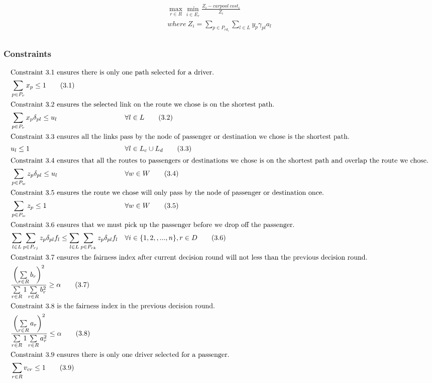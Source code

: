 \begin{align*}
  \max_{r \in R} \min_{i \in E_r} \frac{Z_i - carpool\ cost_i}{Z_i} \tag{IP1} \\
  where\ Z_i = \sum_{p \in P_{rd_i}} \sum_{l \in L} y_p \gamma_{pl} a_l \\
\end{align*}

\subsubsection*{Constraints}

\begin{align*}
  \intertext{Constraint 3.1 ensures there is only one path selected for a driver.}
  & \sum\limits_{p \in P_r} x_p \leq 1 \tag{3.1} \\
  \intertext{Constraint 3.2 ensures the selected link on the route we chose is on the shortest path.}
  & \sum\limits_{p \in P_r} x_p \delta_{pl} \leq u_l && \forall l \in L \tag{3.2} \\
  \intertext{Constraint 3.3 ensures all the links pass by the node of passenger or destination we chose is the shortest path.}
  & u_l \leq 1 && \forall l \in L_c \cup L_d \tag{3.3} \\
  \intertext{Constraint 3.4 ensures that all the routes to passengers or destinations we chose is on the shortest path and overlap the route we chose.}
  & \sum\limits_{p \in P_w} z_p \delta_{pl} \leq u_l && \forall w \in W \tag{3.4} \\
  \intertext{Constraint 3.5 ensures the route we chose will only pass by the node of passenger or destination once.}
  & \sum\limits_{p \in P_w} z_p \leq 1 && \forall w \in W \tag{3.5} \\
  \intertext{Constraint 3.6 ensures that we must pick up the passenger before we drop off the passenger.}
  & \sum\limits_{l \in L} \sum\limits_{p \in P_{rj}} z_p \delta_{pl} f_l \leq \sum\limits_{l \in L} \sum\limits_{p \in P_{rk}} z_p \delta_{pl} f_l && \forall i \in \{1,2,,...,n\}, r \in D \tag{3.6} \\
  \intertext{Constraint 3.7 ensures the fairness index after current decision round will not less than the previous decision round.}
  & \frac{\left(\sum\limits_{r \in R} b_r\right)^2}{\sum\limits_{r \in R} 1 \sum\limits_{r \in R} b_r^2} \geq \alpha \tag{3.7} \\
  \intertext{Constraint 3.8 is the fairness index in the previous decision round.}
  & \frac{\left(\sum\limits_{r \in R} a_r\right)^2}{\sum\limits_{r \in R} 1 \sum\limits_{r \in R} a_r^2} \leq \alpha \tag{3.8} \\
  \intertext{Constraint 3.9 ensures there is only one driver selected for a passenger.}
  & \sum\limits_{r \in R} v_{cr} \leq 1 \tag{3.9} \\
\end{align*}